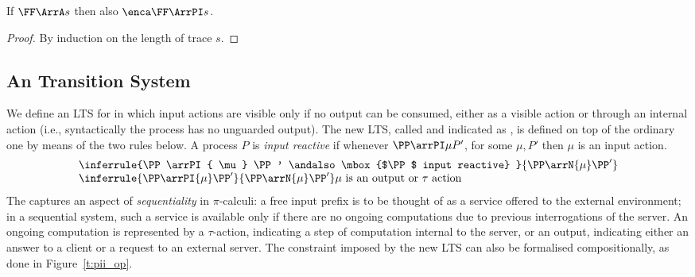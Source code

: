 \begin{corollary}
\label{c:tracesGSpi}
If $\FF \ArrA s$ then also $ \enca \FF \ArrPI s $.
\end{corollary} 

\begin{proof}
By induction on the length of trace $s$.
\end{proof} 

\subsection{An \outputpr Transition System}
\label{subsec:seq-ts-pi}

We define an LTS for \piI in which input actions are
visible only if no output can be consumed, 
either as a  visible action or through an internal action 
(i.e., syntactically the process has no unguarded output). 
The new LTS, called \emph{\outputpr} and indicated as \opLTS,  
is defined on top of the ordinary one 
by means of the two rules below. A process $P$ is \emph{input reactive} if 
whenever $\PP \arrPI \mu  P'$, for some $\mu,P'$ 
 then  $\mu$ is an input action.
 \[
\begin{array}{l}
  \inferrule{\PP \arrPI{ \mu} \PP' \andalso  
  \mbox{$\PP$ input reactive}
 }{\PP \arrN {\mu} \PP'}
\\
  \inferrule{\PP \arrPI{ \mu} \PP'
 }{\PP \arrN {\mu} \PP'}
\mbox{$\mu$ is an output or $\tau$  action}
\end{array}
 \]
The \opLTS captures an aspect of   \emph{sequentiality} 
in  $\pi$-calculi:  
a  free input prefix  is to be  thought of as a service offered to the external environment; 
in a sequential system, such a service is available only if 
there are no ongoing computations due to previous interrogations of the server. 
An ongoing computation is represented by  
a $\tau$-action, indicating a step  of computation  internal to the server, or 
an output, indicating either an answer to a client  or a request to an
external server.  
The constraint imposed by the 
new LTS can also be formalised compositionally,
as done in Figure~\ref{t:pii_op}.

